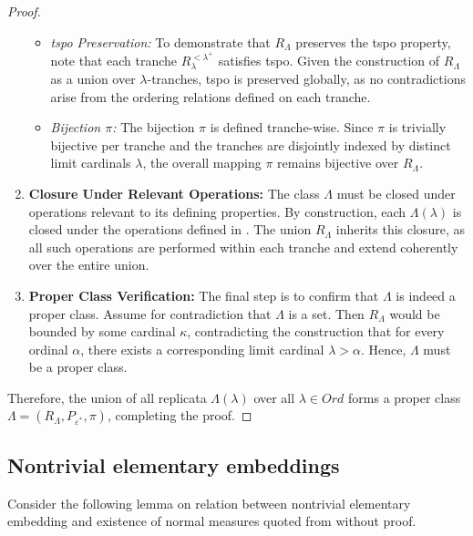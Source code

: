 \begin{proof}
\begin{enumerate}
\begin{itemize}
    \item \textit{tspo Preservation:} To demonstrate that $R_\Lambda$ preserves the tspo property, note that each tranche $R^{<\lambda^+}_\lambda$ satisfies tspo. Given the construction of $R_\Lambda$ as a union over $\lambda$-tranches, tspo is preserved globally, as no contradictions arise from the ordering relations defined on each tranche.
    
    \item \textit{Bijection $\pi$:} The bijection $\pi$ is defined tranche-wise. Since $\pi$ is trivially bijective per tranche and the tranches are disjointly indexed by distinct limit cardinals $\lambda$, the overall mapping $\pi$ remains bijective over $R_\Lambda$.
    \end{itemize}
    
    \item \textbf{Closure Under Relevant Operations:} The class $\Lambda$ must be closed under operations relevant to its defining properties. By construction, each $\Lambda(\lambda)$ is closed under the operations defined in \textit{}. The union $R_\Lambda$ inherits this closure, as all such operations are performed within each tranche and extend coherently over the entire union.
    
    \item \textbf{Proper Class Verification:} The final step is to confirm that $\Lambda$ is indeed a proper class. Assume for contradiction that $\Lambda$ is a set. Then $R_\Lambda$ would be bounded by some cardinal $\kappa$, contradicting the construction that for every ordinal $\alpha$, there exists a corresponding limit cardinal $\lambda > \alpha$. Hence, $\Lambda$ must be a proper class.
    \end{enumerate}
    
    Therefore, the union of all replicata $\Lambda(\lambda)$ over all $\lambda \in Ord$ forms a proper class $\Lambda = (R_\Lambda, P_{\varepsilon^\ast}, \pi)$, completing the proof.
\end{proof}

\subsection{Nontrivial elementary embeddings}

Consider the following lemma on relation between nontrivial elementary embedding and existence of normal measures quoted from \cite{jech2003set} without proof.

